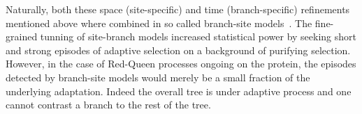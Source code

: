 Naturally, both these space (site-specific) and time (branch-specific) refinements mentioned above where combined in so called branch-site models~\citep{Yang2002, Zhang2004, Pond2011}.
The fine-grained tunning of site-branch models increased statistical power by seeking short and strong episodes of adaptive selection on a background of purifying selection.
However, in the case of Red-Queen processes ongoing on the protein, the episodes detected by branch-site models would merely be a small fraction of the underlying adaptation.
Indeed the overall tree is under adaptive process and one cannot contrast a branch to the rest of the tree.

%


